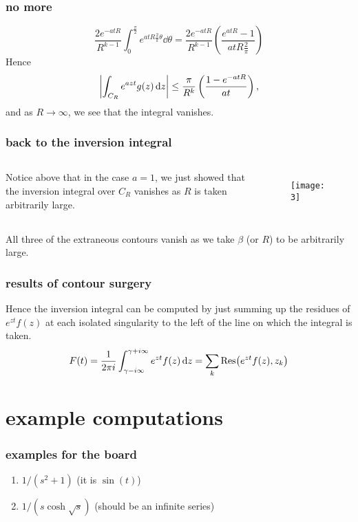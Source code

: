 \documentclass[mathserif]{beamer}
\newcommand{\br}[1]{\left(#1\right)}
\begin{document}
\begin{frame}
  \frametitle{no more}

  \[\frac{2e^{-atR}}{R^{k-1}}\int_{0}^{\frac{\pi}{2}}e^{atR\frac{2}{\pi}\theta}\dd{\theta} = \frac{2e^{-atR}}{R^{k-1}}\br{\frac{e^{atR}-1}{atR\frac{2}{\pi}}}\]
  \pause Hence \[\abs{\int_{C_R}e^{azt}g(z)\dd{z}}\leq \frac{\pi}{R^{k}}\br{\frac{1-e^{-atR}}{at}},\] and as $R\to \infty$, we see that the integral vanishes.

\end{frame}

\begin{frame}
  \frametitle{back to the inversion integral}

  \begin{columns}
    Notice above that in the case $a=1$, we just showed that the inversion integral over $C_R$ vanishes as $R$ is taken arbitrarily large.
      \begin{figure}[h]
        \centering
        \texttt{[image: 3]}
      \end{figure}
    \end{columns}

  \pause All three of the extraneous contours vanish as we take $\beta$ (or $R$) to be arbitrarily large.

\end{frame}

\begin{frame}
  \frametitle{results of contour surgery}

  Hence the inversion integral can be computed by just summing up the residues of $e^{zt}f(z)$ at each isolated singularity to the left of the line on which the integral is taken. \[F(t) = \frac{1}{2\pi i}\int_{\gamma-i\infty}^{\gamma+i\infty} e^{zt}f(z)\dd{z} = \sum_k \Res(e^{zt}f(z), z_k)\]

\end{frame}

\section{example computations}

\begin{frame}
  \frametitle{examples for the board} \begin{enumerate}
    \item $1/(s^2+1)$ (it is $\sin(t)$)
    \item $1/(s\cosh\sqrt{s})$ (should be an infinite series)
  \end{enumerate}
\end{frame}
\end{document}
